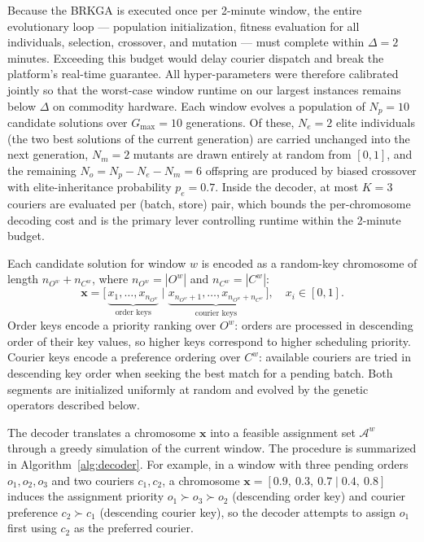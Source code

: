 \documentclass[runningheads]{llncs}
\begin{document}
\setlength{\parskip}{0pt}
Because the BRKGA is executed once per 2-minute window, the entire evolutionary loop — population initialization, fitness evaluation for all individuals, selection, crossover, and mutation — must complete within $\Delta = 2$ minutes. Exceeding this budget would delay courier dispatch and break the platform's real-time guarantee.
All hyper-parameters were therefore calibrated jointly so that the worst-case window runtime on our largest instances remains below $\Delta$ on commodity hardware.
Each window evolves a population of $N_p = 10$ candidate solutions over $G_{\max} = 10$ generations. Of these, $N_e = 2$ elite individuals (the two best solutions of the
current generation) are carried unchanged into the next generation, $N_m = 2$ mutants are drawn entirely at random from $[0,1]$, and the remaining $N_o = N_p - N_e - N_m = 6$ offspring are produced by biased crossover with elite-inheritance probability $p_e = 0.7$. Inside the decoder, at most $K = 3$ couriers are evaluated per (batch, store) pair, which bounds the per-chromosome decoding cost and is the primary lever controlling runtime within the 2-minute budget.

Each candidate solution for window $w$ is encoded as a random-key chromosome of length $n_{O^w} + n_{C^w}$, where $n_{O^w} = |O^w|$ and $n_{C^w} = |C^w|$:
\vspace{-6pt}
\begin{equation}
    \mathbf{x} = \bigl[\,
        \underbrace{x_1, \ldots, x_{n_{O^w}}}_{\text{order keys}}\;
        \Big|\;
        \underbrace{x_{n_{O^w}+1}, \ldots, x_{n_{O^w}+n_{C^w}}}_{\text{courier keys}}\,
    \bigr], \quad x_i \in [0,1].
\end{equation}
\vspace{-1pt}
Order keys encode a priority ranking over $O^w$: orders are processed in descending order of their key values, so higher keys correspond to higher scheduling priority. Courier keys encode a preference ordering over $C^w$: available couriers are tried in descending key order when seeking the best match for a pending batch. Both segments are initialized uniformly at random and evolved by the genetic operators described below.

The decoder translates a chromosome $\mathbf{x}$ into a feasible assignment set $\mathcal{A}^w$ through a greedy simulation of the current window.
The procedure is summarized in Algorithm~\ref{alg:decoder}. For example, in a window with three pending orders ${o_1, o_2, o_3}$ and two couriers ${c_1, c_2}$, a chromosome $\mathbf{x} = [0.9,\ 0.3,\ 0.7 \mid 0.4,\ 0.8]$ induces the assignment priority $o_1 \succ o_3 \succ o_2$ (descending order key) and courier preference $c_2 \succ c_1$ (descending courier key), so the decoder attempts to assign $o_1$ first using $c_2$ as the preferred courier.
\end{document}
